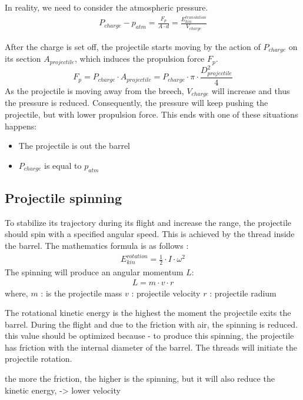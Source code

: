 \documentclass[12pt,a4paper]{article}
\begin{document}
In reality, we need to consider the atmospheric pressure. 
\begin{eqnarray}
	P_{charge} - p_{atm} = \frac{F_p}{A \cdot d} = \frac{E_{kin}^{translation}}{V_{charge}}
\end{eqnarray}


After the charge is set off, the projectile starts moving by the action of $P_{charge}$ on its section $A_{projectile}$, which induces the propulsion force $F_p$. 
\begin{equation}
	F_p = P_{charge} \cdot A_{projectile} =  P_{charge} \cdot \pi \cdot \frac{D_{projectile}^2}{4}
\end{equation}
As the projectile is moving away from the breech, $ V_{charge}$ will increase and thus the pressure is reduced. Consequently, the pressure will keep pushing the projectile, but with lower propulsion force. This ends with one of these situations happens:  
\begin{itemize}
	\item The projectile is out the barrel
	\item $P_{charge}$ is equal to $p_{atm}$
\end{itemize}

\subsection{Projectile spinning}
To stabilize its trajectory during its flight and increase the range, the projectile should spin with a specified angular speed. This is achieved by the thread inside the barrel. The mathematics formula is as follows :  
\begin{eqnarray}
	E_{kin}^{rotation} = \frac{1}{2} \cdot I \cdot \omega ^ 2
\end{eqnarray}
The spinning will produce an angular momentum $L$:
\begin{eqnarray}
	L = m \cdot v \cdot r
\end{eqnarray}
where, 
$m$ : is the projectile mass
$v$ : projectile velocity
$r$ : projectile radium

The rotational kinetic energy is the highest the moment the projectile exits the barrel. During the flight and due to the friction with air, the spinning is reduced.
this value should be optimized because
- to produce this spinning, the projectile has friction with the internal diameter of the barrel. The threads will initiate the projectile rotation. 

the more the friction, the higher is the spinning, but it will also reduce the kinetic energy, -> lower velocity
\end{document}
